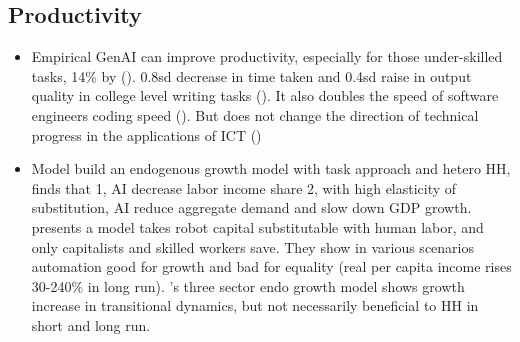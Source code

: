 \documentclass[10pt]{article} %
\begin{document}
    \subsection{Productivity}
    \begin{itemize}
        \item Empirical\newline
        GenAI can improve productivity, especially for those under-skilled tasks, 14\% by \cite{BrynjolfssonLiRaymond2023} (\cite{Damiolietal2021}). 0.8sd decrease in time taken and 0.4sd raise in output quality in college level writing tasks (\cite{NoyZhang2023}). It also doubles the speed of software engineers coding speed (\cite{Kalliamvakou2022}). But does not change the direction of technical progress in the applications of ICT (\cite{Bresnahan2021})
 
        \item Model\newline
        \cite{GriesNaude2020} build an endogenous growth model with task approach and hetero HH, finds that 1, AI decrease labor income share 2, with high elasticity of substitution, AI reduce aggregate demand and slow down GDP growth. \cite{BergBuffieZanna2018} presents a model takes robot capital substitutable with human labor, and only capitalists and skilled workers save. They show in various scenarios automation good for growth and bad for equality (real per capita income rises 30-240\% in long run). \cite{Lu2021}'s three sector endo growth model shows growth increase in transitional dynamics, but not necessarily beneficial to HH in short and long run.

    \end{itemize}
\end{document}
